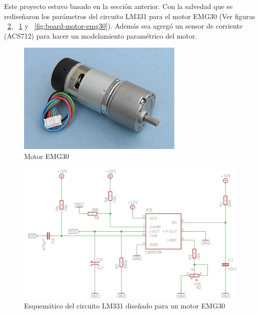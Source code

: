 Este proyecto estuvo basado en la sección anterior. Con la salvedad que se rediseñaron los parámetros del circuito LM331 para el motor EMG30 (Ver figuras ~\ref{fig:schematic-board-motor-emg30}, ~\ref{fig:motor-emg30} y ~\ref{fig:board-motor-emg30}). Además sea agregó un sensor de corriente (ACS712) para hacer un modelamiento paramétrico del motor.

\begin{figure}[h!]
  \centering
  \includegraphics[scale=0.8]{images/activities/motor_emg30/motor-emg30.jpg}
  \caption{Motor EMG30}
  \label{fig:motor-emg30}
\end{figure}

\begin{figure}[h!]
  \centering
  \includegraphics[scale=0.2]{images/activities/motor_emg30/schematic-board-motor-emg30.png}
  \caption{Esquemático del circuito LM331 diseñado para un motor EMG30}
  \label{fig:schematic-board-motor-emg30}
\end{figure}

